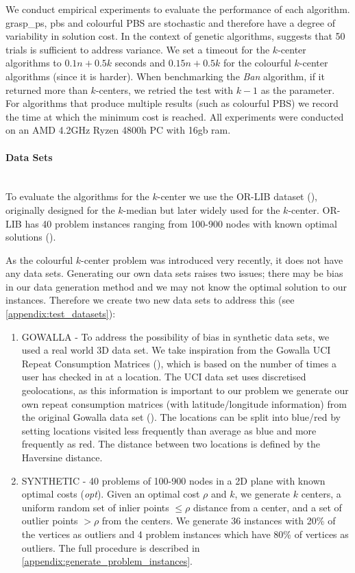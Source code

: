 We conduct empirical experiments to evaluate the performance of each algorithm. \acrshort{grasp_ps}, \acrshort{pbs} and colourful PBS are stochastic and therefore have a degree of variability in solution cost. In the context of genetic algorithms, \textcite{kramer_genetic_2017} suggests that 50 trials is sufficient to address variance. We set a timeout for the $k$-center algorithms to $0.1n + 0.5k$ seconds and $0.15n + 0.5k$ for the colourful $k$-center algorithms (since it is harder). When benchmarking the \emph{Ban} algorithm, if it returned more than $k$-centers, we retried the test with $k-1$ as the parameter. For algorithms that produce multiple results (such as colourful PBS) we record the time at which the minimum cost is reached. All experiments were conducted on an AMD 4.2GHz Ryzen 4800h PC with 16gb ram. 

\paragraph{Data Sets}~\\
To evaluate the algorithms for the $k$-center we use the OR-LIB dataset (\cite{beasley_note_1985}), originally designed for the $k$-median but later widely used for the $k$-center. OR-LIB has 40 problem instances ranging from 100-900 nodes with known optimal solutions (\cite{pullan_memetic_2008}). 

As the colourful $k$-center problem was introduced very recently, it does not have any data sets. Generating our own data sets raises two issues; there may be bias in our data generation method and we may not know the optimal solution to our instances. Therefore we create two new data sets to address this (see \cref{appendix:test_datasets}):
\begin{enumerate}
    \item GOWALLA - To address the possibility of bias in synthetic data sets, we used a real world 3D data set. We take inspiration from the Gowalla UCI Repeat Consumption Matrices (\cite{kotzias_predicting_2019}), which is based on the number of times a user has checked in at a location. The UCI data set uses discretised geolocations, as this information is important to our problem we generate our own repeat consumption matrices (with latitude/longitude information) from the original Gowalla data set (\cite{cho_friendship_2011}). The locations can be split into blue/red by setting locations visited less frequently than average as blue and more frequently as red. The distance between two locations is defined by the Haversine distance. 
    \item SYNTHETIC - 40 problems of 100-900 nodes in a 2D plane with known optimal costs (\emph{opt}). Given an optimal cost $\rho$ and $k$, we generate $k$ centers, a uniform random set of inlier points $\leq\rho$ distance from a center, and a set of outlier points $>\rho$ from the centers. We generate 36 instances with 20\% of the vertices as outliers and 4 problem instances which have 80\% of vertices as outliers. The full procedure is described in \cref{appendix:generate_problem_instances}.
\end{enumerate}

